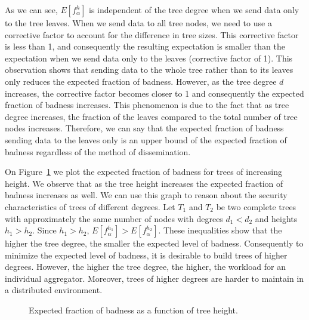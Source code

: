\documentclass[10pt,twocolumn]{style}
\begin{document}
  As we can see, $E[f^h_\alpha]$ is independent of the tree
  degree when we send data only to the tree leaves. When we send data
  to all tree nodes, we need to use a corrective factor to account for
  the difference in tree sizes. This corrective factor is less than
  1, and consequently the resulting expectation is smaller than the
  expectation when we send data only to the leaves (corrective factor
  of 1). This observation shows that sending data to the whole tree
  rather than to its leaves only reduces the expected fraction of
  badness. However, as the tree degree $d$ increases, the corrective
  factor becomes closer to 1 and consequently the expected fraction of
  badness increases. This phenomenon is due to the fact that as tree
  degree increases, the fraction of the leaves compared to the total
  number of tree nodes increases. Therefore, we can say that the
  expected fraction of badness sending data to the leaves only is an
  upper bound of the expected fraction of badness regardless of the
  method of dissemination. 



  On Figure~\ref{fig:exp_badness} we plot the expected fraction of
  badness for trees of increasing height. We observe that as the tree
  height increases the expected fraction of badness increases as
  well. We can use this graph to reason about the security
  characteristics of trees of different degrees. Let $T_1$ and $T_2$
  be two complete trees with approximately the same number of nodes
  with degrees $d_1 < d_2$ and heights $h_1 > h_2$. Since $h_1 >
  h_2$, $E[f^{h_1}_{\alpha}] > E[f^{h_2}_{\alpha}]$. These
  inequalities show that the higher the tree degree, the smaller the expected level of
  badness. Consequently to minimize the expected level of badness, it
  is desirable to build trees of higher degrees. However, the higher
  the tree degree, the higher, the workload for an individual
  aggregator. Moreover, trees of higher degrees are harder to
  maintain in a distributed environment. 

  \begin{figure}[htpb!]
    \begin{center}
      \caption{\label{fig:exp_badness} Expected fraction of badness as a
      function of tree height.}
    \end{center}
  \end{figure}
\end{document}
